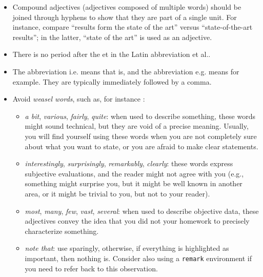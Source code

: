 \documentclass[letterpaper, 10 pt, conference]{ieeeconf}
\begin{document}
\begin{itemize}
\item Compound adjectives (adjectives composed of multiple words) should be joined through hyphens to show that they are part of a single unit. For instance, compare ``results form the state of the art'' versus ``state-of-the-art results''; in the latter, ``state of the art'' is used as an adjective.
\item There is no period after the et in the Latin abbreviation et al..
\item The abbreviation i.e. means that is, and the abbreviation e.g. means for example. They are typically immediately followed by a comma.
\item Avoid \emph{weasel words}, such as, for instance \cite{WeaselWords}:
  \begin{itemize}
  \item \emph{a bit}, \emph{various}, \emph{fairly}, \emph{quite}: when used to describe something, these words might sound technical, but they are void of a precise meaning. Usually, you will find yourself using these words when you are not completely sure about what you want to state, or you are afraid to make clear statements.
  \item \emph{interestingly}, \emph{surprisingly}, \emph{remarkably}, \emph{clearly}: these words express subjective evaluations, and the reader might not agree with you (e.g., something might surprise you, but it might be well known in another area, or it might be trivial to you, but not to your reader).
  \item \emph{most}, \emph{many}, \emph{few}, \emph{vast}, \emph{several}: when used to describe objective data, these adjectives convey the idea that you did not your homework to precisely characterize something.
  \item \emph{note that}: use sparingly, otherwise, if everything is highlighted as important, then nothing is. Consider also using a \texttt{remark} environment if you need to refer back to this observation.
  \end{itemize}
\end{itemize}
\end{document}
